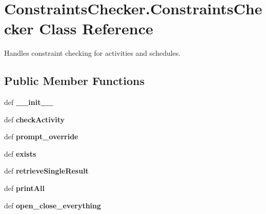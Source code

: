 \hypertarget{classConstraintsChecker_1_1ConstraintsChecker}{\section{Constraints\-Checker.\-Constraints\-Checker Class Reference}
\label{classConstraintsChecker_1_1ConstraintsChecker}
}


Handles constraint checking for activities and schedules.  


\subsection*{Public Member Functions}
\begin{DoxyCompactItemize}
\item 
\hypertarget{classConstraintsChecker_1_1ConstraintsChecker_aafea6f185c3fef070c72212aa3b103ac}{def {\bfseries \-\_\-\-\_\-init\-\_\-\-\_\-}}\label{classConstraintsChecker_1_1ConstraintsChecker_aafea6f185c3fef070c72212aa3b103ac}

\item 
\hypertarget{classConstraintsChecker_1_1ConstraintsChecker_ab9412dd06763ea9383dfe70fae661a4e}{def {\bfseries check\-Activity}}\label{classConstraintsChecker_1_1ConstraintsChecker_ab9412dd06763ea9383dfe70fae661a4e}

\item 
\hypertarget{classConstraintsChecker_1_1ConstraintsChecker_ab9b9ee65d1efe0902de050a9c045dd7e}{def {\bfseries prompt\-\_\-override}}\label{classConstraintsChecker_1_1ConstraintsChecker_ab9b9ee65d1efe0902de050a9c045dd7e}

\item 
\hypertarget{classConstraintsChecker_1_1ConstraintsChecker_a93c9a9093c04f97268a9f9f71dd220d0}{def {\bfseries exists}}\label{classConstraintsChecker_1_1ConstraintsChecker_a93c9a9093c04f97268a9f9f71dd220d0}

\item 
\hypertarget{classConstraintsChecker_1_1ConstraintsChecker_a60c0c8e82323c9ccb818f7a5f22fa49d}{def {\bfseries retrieve\-Single\-Result}}\label{classConstraintsChecker_1_1ConstraintsChecker_a60c0c8e82323c9ccb818f7a5f22fa49d}

\item 
\hypertarget{classConstraintsChecker_1_1ConstraintsChecker_a95aa9feb78817ee9a7aacf2c0ccddd25}{def {\bfseries print\-All}}\label{classConstraintsChecker_1_1ConstraintsChecker_a95aa9feb78817ee9a7aacf2c0ccddd25}

\item 
\hypertarget{classConstraintsChecker_1_1ConstraintsChecker_aa1148ff1bb81feb170a0ea84e520ebc0}{def {\bfseries open\-\_\-close\-\_\-everything}}\label{classConstraintsChecker_1_1ConstraintsChecker_aa1148ff1bb81feb170a0ea84e520ebc0}

\end{DoxyCompactItemize}
